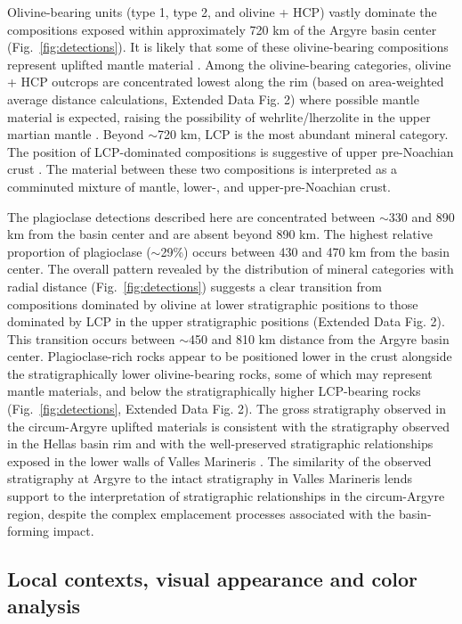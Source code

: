 \documentclass[12pt]{article}
\begin{document}
Olivine-bearing units (type 1, type 2, and olivine + HCP) vastly dominate the compositions exposed within approximately 720 km of the Argyre basin center (Fig.~\ref{fig:detections}). It is likely that some of these olivine-bearing compositions represent uplifted mantle material \citep[Extended Data Fig. 1;][]{Koeppen2008, Ody2013}. Among the olivine-bearing categories, olivine + HCP outcrops are concentrated lowest along the rim (based on area-weighted average distance calculations, Extended Data Fig. 2) where possible mantle material is expected, raising the possibility of wehrlite/lherzolite in the upper martian mantle \citep{McGetchin1978, Treiman2025, Bernadet2025}. Beyond $\sim$720 km, LCP is the most abundant mineral category. The position of LCP-dominated compositions is suggestive of upper pre-Noachian crust \citep{Buczkowski2010, McNeil2025}. The material between these two compositions is interpreted as a comminuted mixture of mantle, lower-, and upper-pre-Noachian crust. 

The plagioclase detections described here are concentrated between $\sim$330 and 890 km from the basin center and are absent beyond 890 km. The highest relative proportion of plagioclase ($\sim$29\%) occurs between 430 and 470 km from the basin center. The overall pattern revealed by the distribution of mineral categories with radial distance (Fig.~\ref{fig:detections}) suggests a clear transition from compositions dominated by olivine at lower stratigraphic positions to those dominated by LCP in the upper stratigraphic positions (Extended Data Fig. 2). This transition occurs between $\sim$450 and 810 km distance from the Argyre basin center. Plagioclase-rich rocks appear to be positioned lower in the crust alongside the stratigraphically lower olivine-bearing rocks, some of which may represent mantle materials, and below the stratigraphically higher LCP-bearing rocks (Fig.~\ref{fig:detections}, Extended Data Fig. 2). The gross stratigraphy observed in the circum-Argyre uplifted materials is consistent with the stratigraphy observed in the Hellas basin rim \citep{Phillips2022} and with the well-preserved stratigraphic relationships exposed in the lower walls of Valles Marineris \citep{Viviano-Beck2017}. The similarity of the observed stratigraphy at Argyre to the intact stratigraphy in Valles Marineris lends support to the interpretation of stratigraphic relationships in the circum-Argyre region, despite the complex emplacement processes associated with the basin-forming impact.

\subsection*{Local contexts, visual appearance and color analysis}
\end{document}
